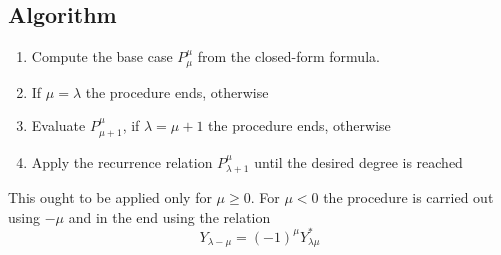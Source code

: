 \subsection{Algorithm}
\begin{enumerate}
    \item Compute the base case $P_\mu^\mu$ from the closed-form formula.
    \item If $\mu = \lambda$ the procedure ends, otherwise
    \item Evaluate $P_{\mu+1}^\mu$, if $\lambda = \mu +1$ the procedure ends, otherwise
    \item Apply the recurrence relation $P_{\lambda+1}^\mu$ until the desired degree is reached
\end{enumerate}
This ought to be applied only for $ \mu \ge 0$. For $\mu < 0$ the procedure is carried out using $-\mu$ and in the end using the relation
\begin{equation}
    Y_{\lambda-\mu} = (-1)^{\mu}Y_{\lambda\mu}^{*}
\end{equation}


